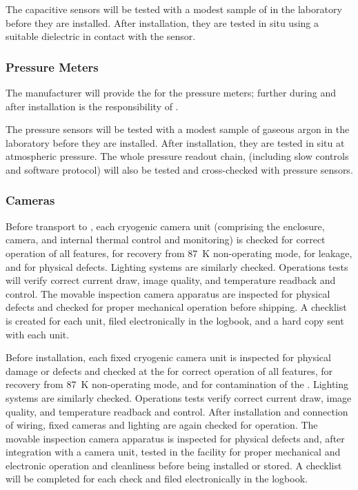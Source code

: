 The capacitive sensors will be tested with a modest sample of  in the laboratory before they are installed. After installation, they are tested in situ %
using a suitable dielectric in contact with the sensor.

\subsubsection{Pressure Meters}
\label{sec:fdgen-slow-cryo-qc-press}
The manufacturer will provide the  for the pressure meters; further  during and after installation is the responsibility of .

The pressure sensors will be tested with a modest sample of gaseous argon in the laboratory before they are installed. After installation, they are tested in situ at atmospheric pressure. The whole pressure readout chain, (including slow controls  and software protocol) 
will also be tested and cross-checked with  pressure sensors.

\subsubsection{Cameras}
\label{sec:fdgen-slow-cryo-qc-c}

Before %
transport to \surf, each cryogenic camera unit (comprising the enclosure, camera, and internal thermal control and monitoring) %
is checked for correct operation of all features, for recovery from \SI{87}{K} non-operating mode, for leakage, and for physical defects. Lighting systems %
are similarly checked. Operations tests will verify correct current draw, image quality, and temperature readback and control. The movable inspection camera apparatus %
are inspected for physical defects and checked for proper mechanical operation before shipping. A checklist %
is created for each unit, filed electronically in the  logbook, and a hard copy sent with each unit. 

Before installation, each fixed cryogenic camera unit is inspected for physical damage or defects and checked at the 
for correct operation of all features, for recovery from \SI{87}{K} non-operating mode, and for contamination of the . Lighting systems are similarly checked. Operations tests verify correct current draw, image quality, and temperature readback and control. After installation and connection of wiring, fixed cameras and lighting are again  checked for operation. The movable inspection camera apparatus is inspected for physical defects and, after integration with a camera unit, tested in the facility for proper mechanical and electronic operation and cleanliness before being installed or stored. A checklist will be completed for each  check and filed electronically in the  logbook. 

